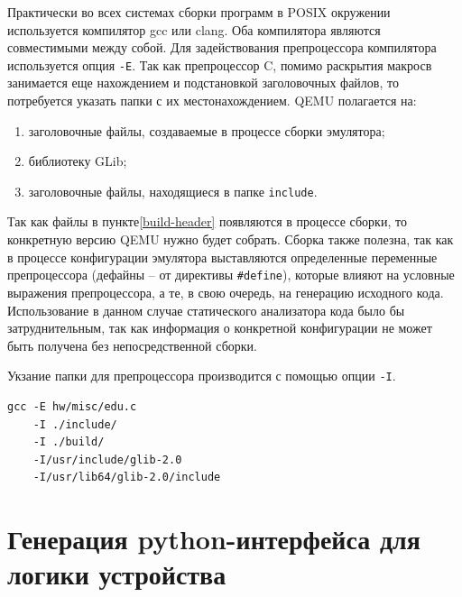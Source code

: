Практически во всех системах сборки программ в POSIX \cite{posix} окружении используется компилятор gcc или clang.
Оба компилятора являются совместимыми между собой. Для задействования препроцессора компилятора используется
опция \texttt{-E}. Так как препроцессор C, помимо раскрытия макросв занимается еще нахождением и подстановкой
заголовочных файлов, то потребуется указать папки с их местонахождением.
QEMU полагается на:
\begin{enumerate}[label={\arabic*)}]
    \item \label{build-header} заголовочные файлы, создаваемые в процессе сборки эмулятора;
    \item библиотеку GLib;
    \item заголовочные файлы, находящиеся в папке \texttt{include}.
\end{enumerate}

Так как файлы в пункте\cref{build-header} появляются в процессе сборки, то конкретную версию QEMU нужно будет собрать.
Сборка также полезна, так как в процессе конфигурации эмулятора выставляются определенные переменные
препроцессора (дефайны -- от директивы \texttt{\#define}), которые влияют на условные выражения
препроцессора, а те, в свою очередь, на генерацию исходного кода.
Использование в данном случае статического анализатора кода было бы затруднительным, так как
информация о конкретной конфигурации не может быть получена без непосредственной сборки.

Укзание папки для препроцессора производится с помощью опции \texttt{-I}.
\begin{lstlisting}[caption={Пример строки запуска препроцессора для определенного файла устройства},
                   captionpos=b]
gcc -E hw/misc/edu.c
    -I ./include/
    -I ./build/
    -I/usr/include/glib-2.0
    -I/usr/lib64/glib-2.0/include
\end{lstlisting}


\section{Генерация python-интерфейса для логики устройства}\label{sec:ch2/sec2/sub3}

